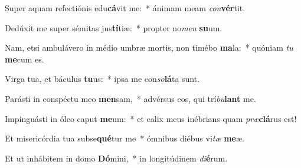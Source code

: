\item Super aquam refectiónis edu\textbf{cá}vit me:~* ánimam meam \textit{con}\textbf{vér}tit.
\item Dedúxit me super sémitas jus\textbf{tí}tiæ:~* propter no\textit{men} \textbf{su}um.
\item Nam, etsi ambulávero in médio umbræ mortis, non timébo \textbf{ma}la:~* quóniam \textit{tu} \textbf{me}cum es.
\item Virga tua, et báculus \textbf{tu}us:~* ipsa me con\textit{so}\textbf{lá}ta sunt.
\item Parásti in conspéctu meo \textbf{men}sam,~* advérsus eos, qui trí\textit{bu}\textbf{lant} me.
\item Impinguásti in óleo caput \textbf{me}um:~* et calix meus inébrians quam \textit{præ}\textbf{clá}rus est!
\item Et misericórdia tua subse\textbf{qué}tur me~* ómnibus diébus vi\textit{tæ} \textbf{me}æ.
\item Et ut inhábitem in domo \textbf{Dó}mini,~* in longitúdinem \textit{di}\textbf{é}rum.
